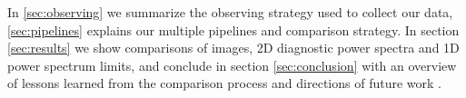 \documentclass[preprint]{aastex}
\def\eppsilon{{\it $\epsilon$ppsilon }}
\def\empirical cov{\emph{EMPCOV }}
\def\chipscite{Trott et al 2015}
\def\eppsiloncite{Hazelton et al 2015}
\def\dilloncite{Dillon et al 2015}
\begin{document}
In \ref{sec:observing} we summarize the observing strategy used to collect our data, \ref{sec:pipelines} explains our multiple pipelines and comparison strategy. In section \ref{sec:results} we show comparisons of images, 2D diagnostic power spectra and 1D power spectrum limits, and conclude in section \ref{sec:conclusion} with an overview of lessons learned from the comparison process and directions of future work .


%
%
% 
\end{document}
